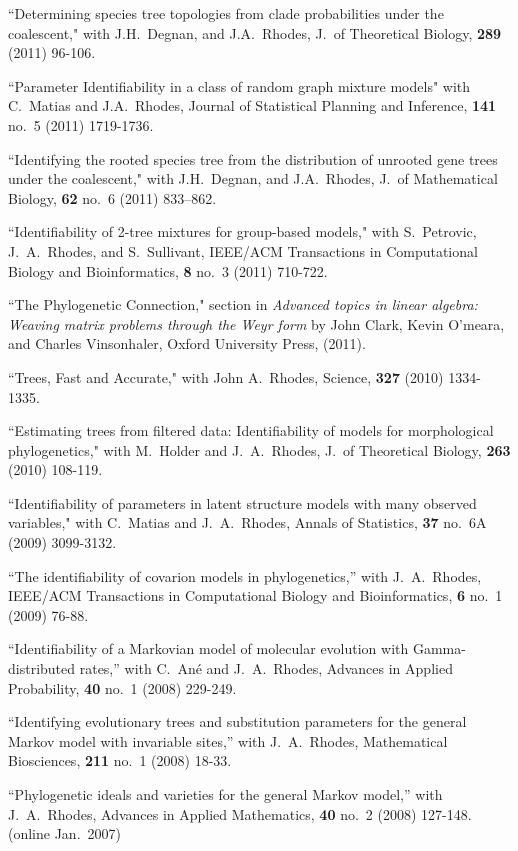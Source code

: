 \documentclass[10pt]{report}
\begin{document}
{{``Determining species tree topologies from clade probabilities under the coalescent,"
with J.H.~Degnan, and J.A.~Rhodes,
J.~of Theoretical Biology, {\bf 289} (2011) 96-106.

``Parameter Identifiability in a class of random graph mixture models"
with C.~Matias and J.A.~Rhodes,
Journal of Statistical Planning and Inference, {\bf 141} no.~5 (2011) 1719-1736.

``Identifying the rooted species tree from the distribution of unrooted gene trees under the coalescent,"
with J.H.~Degnan, and J.A.~Rhodes,
J.~of Mathematical Biology, {\bf 62} no.~6 (2011) 833--862.

``Identifiability of 2-tree mixtures for group-based models,"
with  S.~Petrovic, J.~A.~Rhodes, and S.~Sullivant,
IEEE/ACM Transactions in Computational Biology and Bioinformatics, 
{\bf 8} no.~3 (2011) 710-722.

``The Phylogenetic Connection," section
in \emph{Advanced topics in linear algebra: {W}eaving matrix problems through the Weyr form} 
by John Clark, Kevin O'meara, and Charles Vinsonhaler,
Oxford University Press, (2011).

``Trees, Fast and Accurate,"
with John A.~Rhodes,
Science, {\bf 327} (2010) 1334-1335.

``Estimating trees from filtered data: Identifiability of models
for morphological phylogenetics,"
with M.~Holder and J.~A.~Rhodes,
J.~of Theoretical Biology, {\bf 263} (2010) 108-119.

``Identifiability of parameters in latent structure models with many observed variables,"
with C.~Matias and J.~A.~Rhodes,  
Annals of Statistics, {\bf 37} no.~6A (2009) 3099-3132.

``The identifiability of covarion models in phylogenetics,''
with J.~A.~Rhodes, IEEE/ACM Transactions in Computational Biology and
Bioinformatics, {\bf 6} no.~1 (2009) 76-88.

``Identifiability of a Markovian model of molecular evolution
with Gamma-distributed rates,''
with C.~An\'e and J.~A.~Rhodes, Advances in Applied Probability,
{\bf 40} no.~1 (2008) 229-249.

``Identifying evolutionary trees and substitution parameters
for the general Markov model with invariable sites,'' with
J.~A.~Rhodes, Mathematical Biosciences, {\bf 211} no.~1 (2008) 18-33.

``Phylogenetic ideals and varieties for the general Markov model,''
with J.~A.~Rhodes, Advances in Applied Mathematics, {\bf 40} no.~2
(2008) 127-148.
(online Jan.~2007)

}}
\end{document}
